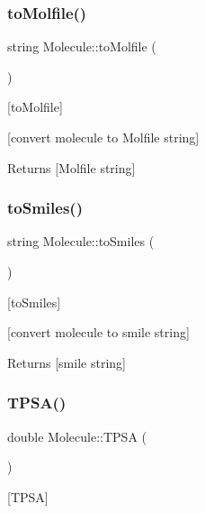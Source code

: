 \subsubsection{\texorpdfstring{to\+Molfile()}{toMolfile()}}
{\footnotesize\ttfamily string Molecule\+::to\+Molfile (\begin{DoxyParamCaption}{ }\end{DoxyParamCaption})}



\mbox{[}to\+Molfile\mbox{]} 

\mbox{[}convert molecule to Molfile string\mbox{]}

\begin{DoxyReturn}{Returns}
\mbox{[}Molfile string\mbox{]} 
\end{DoxyReturn}
\mbox{\label{class_molecule_a0ccd79755ccd96be3d17eacfe77b1a07}} 
\subsubsection{\texorpdfstring{to\+Smiles()}{toSmiles()}}
{\footnotesize\ttfamily string Molecule\+::to\+Smiles (\begin{DoxyParamCaption}{ }\end{DoxyParamCaption})}



\mbox{[}to\+Smiles\mbox{]} 

\mbox{[}convert molecule to smile string\mbox{]}

\begin{DoxyReturn}{Returns}
\mbox{[}smile string\mbox{]} 
\end{DoxyReturn}
\mbox{\label{class_molecule_ac5e52f33289342df7147a7151890df95}} 
\subsubsection{\texorpdfstring{T\+P\+S\+A()}{TPSA()}}
{\footnotesize\ttfamily double Molecule\+::\+T\+P\+SA (\begin{DoxyParamCaption}{ }\end{DoxyParamCaption})}



\mbox{[}T\+P\+SA\mbox{]} 

